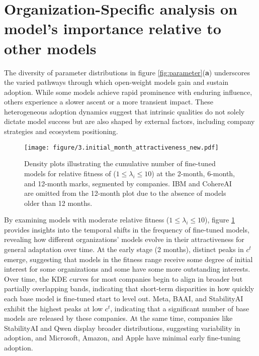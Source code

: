 \documentclass{article} %
\begin{document}
    \section{Organization-Specific analysis on model's importance relative to other models}
        The diversity of parameter distributions in figure \ref{fig:parameter}(\textbf{a}) underscores the varied pathways through which open-weight models gain and sustain adoption. While some models achieve rapid prominence with enduring influence, others experience a slower ascent or a more transient impact. These heterogeneous adoption dynamics suggest that intrinsic qualities do not solely dictate model success but are also shaped by external factors, including company strategies and ecosystem positioning.
        \begin{figure}[h]
            \begin{center}
                \texttt{[image: figure/3.initial\_month\_attractiveness\_new.pdf]}
            \end{center}
            \caption{Density plots illustrating the cumulative number of fine-tuned models for relative fitness of ($1 \leq \lambda_i \leq 10$) at the 2-month, 6-month, and 12-month marks, segmented by companies. IBM and CohereAI are omitted from the 12-month plot due to the absence of models older than 12 months.}
            \label{fig:distribution_time_period}
        \end{figure}
        
         By examining models with moderate relative fitness ($1 \leq \lambda_i \leq 10$), figure \ref{fig:distribution_time_period} provides insights into the temporal shifts in the frequency of fine-tuned models, revealing how different organizations’ models evolve in their attractiveness for general adaptation over time. At the early stage (2 months), distinct peaks in $c^t$ emerge, suggesting that models in the fitness range receive some degree of initial interest for some organizations and some have some more outstanding interests. Over time, the KDE curves for most companies begin to align in broader but partially overlapping bands, indicating that short‐term disparities in how quickly each base model is fine‐tuned start to level out. 
         Meta, BAAI, and StabilityAI exhibit the highest peaks at low $c^t$, indicating that a significant number of base models are released by these companies. At the same time, companies like StabilityAI and Qwen display broader distributions, suggesting variability in adoption, and Microsoft, Amazon, and Apple have minimal early fine-tuning adoption.
        
\end{document}

